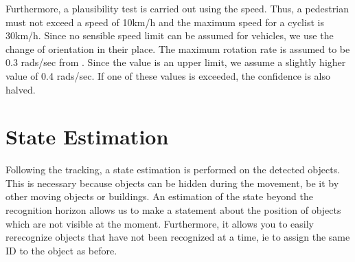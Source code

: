 \documentclass[11pt,oneside,openright]{mpreport}
\begin{document}

Furthermore, a plausibility test is carried out using the speed. Thus, a pedestrian must not exceed a speed of 10km/h and the maximum speed for a cyclist is 30km/h.
Since no sensible speed limit can be assumed for vehicles, we use the change of orientation in their place.
The maximum rotation rate is assumed to be 0.3 rads/sec from \cite{Kelly1994}. Since the value is an upper limit, we assume a slightly higher value of 0.4 rads/sec.
If one of these values is exceeded, the confidence is also halved.


%     
%   


\section{State Estimation}

Following the tracking, a state estimation is performed on the detected objects. This is necessary because objects can be hidden during the movement,
be it by other moving objects or buildings. An estimation of the state beyond the recognition horizon allows us to make a statement about the position of 
objects which are not visible at the moment. Furthermore, it allows you to easily rerecognize objects that have not been recognized at a time, ie to assign the same ID to the object as before.
\end{document}
